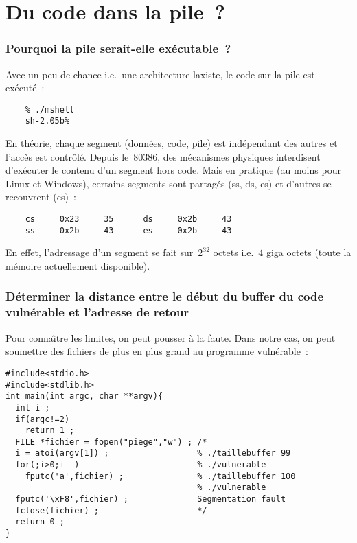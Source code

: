 \section{Du code dans la pile~?}
\begin{frame}[fragile]
  \frametitle{Pourquoi la pile serait-elle ex\'ecutable~?}%
  Avec un peu de chance i.e.\ une architecture laxiste, le code sur la
  pile est ex\'ecut\'e~:
\begin{verbatim}
    % ./mshell
    sh-2.05b%
\end{verbatim}%
  En th\'eorie, chaque segment (donn\'ees, code, pile) est
  ind\'ependant des autres et l'acc\`es est contr\^ol\'e.  Depuis
  le~$80386$, des m\'ecanismes physiques interdisent d'ex\'ecuter le
  contenu d'un segment hors code.  Mais en pratique (au moins pour
  Linux et Windows), certains segments sont partag\'es (ss, ds, es) et
  d'autres se recouvrent (cs)~:
\begin{verbatim}
    cs     0x23     35      ds     0x2b     43
    ss     0x2b     43      es     0x2b     43
\end{verbatim}%
  En effet, l'adressage d'un segment se fait sur~$2^{32}$ octets
  i.e.~$4$ giga octets (toute la m\'emoire actuellement disponible).
\end{frame}
\begin{frame}[fragile]
  \frametitle{D\'eterminer la distance entre le d\'ebut du buffer du code
  vuln\'erable et l'adresse de retour}%
  Pour conna\^\i{}tre les limites, on peut pousser \`a
  la faute. Dans notre cas, on peut soumettre des fichiers de plus en
  plus grand au programme vuln\'erable~:
  \begin{verbatim}
#include<stdio.h>
#include<stdlib.h>
int main(int argc, char **argv){
  int i ;
  if(argc!=2)
    return 1 ;
  FILE *fichier = fopen("piege","w") ; /*                    
  i = atoi(argv[1]) ;                  % ./taillebuffer 99   
  for(;i>0;i--)                        % ./vulnerable        
    fputc('a',fichier) ;               % ./taillebuffer 100  
                                       % ./vulnerable        
  fputc('\xF8',fichier) ;              Segmentation fault    
  fclose(fichier) ;                    */                    
  return 0 ;
}
  \end{verbatim}
\end{frame}
